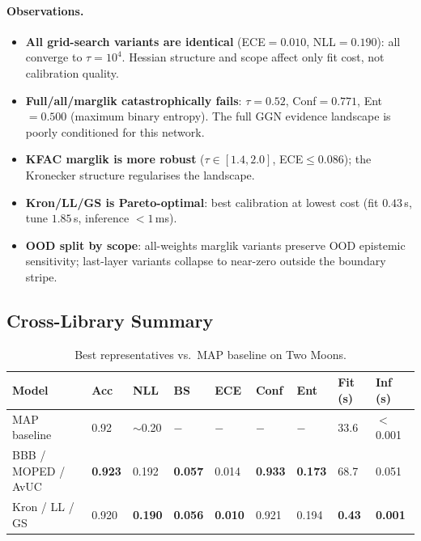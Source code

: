 \documentclass[12pt,a4paper]{article}
\begin{document}
\paragraph{Observations.}
\begin{itemize}[leftmargin=*,topsep=2pt,itemsep=1pt]
  \item \textbf{All grid-search variants are identical} (ECE$=0.010$,
    NLL$=0.190$): all converge to $\tau=10^4$. Hessian structure and scope
    affect only fit cost, not calibration quality.
  \item \textbf{Full/all/marglik catastrophically fails}: $\tau=0.52$,
    Conf$=0.771$, Ent$=0.500$ (maximum binary entropy). The full GGN
    evidence landscape is poorly conditioned for this network.
  \item \textbf{KFAC marglik is more robust} ($\tau\in[1.4,2.0]$,
    ECE$\leq0.086$); the Kronecker structure regularises the landscape.
  \item \textbf{Kron/LL/GS is Pareto-optimal}: best calibration at lowest
    cost (fit $0.43$\,s, tune $1.85$\,s, inference $<1$\,ms).
  \item \textbf{OOD split by scope}: all-weights marglik variants preserve
    OOD epistemic sensitivity; last-layer variants collapse to near-zero
    outside the boundary stripe.
\end{itemize}

\subsection{Cross-Library Summary}

\begin{table}[H]
  \centering
  \caption{Best representatives vs.\ MAP baseline on Two Moons.}
  \label{tab:cross}
  \small\setlength{\tabcolsep}{4pt}
  \begin{tabular}{L{3.8cm} C{0.8cm} C{0.8cm} C{0.8cm} C{0.8cm}
                  C{0.8cm} C{0.8cm} C{1.4cm} C{1.4cm}}
    \toprule
    \textbf{Model} & \textbf{Acc} & \textbf{NLL} & \textbf{BS}
      & \textbf{ECE} & \textbf{Conf} & \textbf{Ent}
      & \textbf{Fit\,(s)} & \textbf{Inf\,(s)} \\
    \midrule
    MAP baseline           & 0.92 & $\sim$0.20 & $-$ & $-$ & $-$ & $-$ & 33.6 & $<$0.001 \\
    \midrule
    BBB / MOPED / AvUC  & \textbf{0.923} & 0.192 & \textbf{0.057} & 0.014
      & \textbf{0.933} & \textbf{0.173} & 68.7 & 0.051 \\
    \midrule
    Kron / LL / GS      & 0.920 & \textbf{0.190} & \textbf{0.056} & \textbf{0.010}
      & 0.921 & 0.194 & \textbf{0.43} & \textbf{0.001} \\
    \bottomrule
  \end{tabular}
\end{table}
\end{document}
